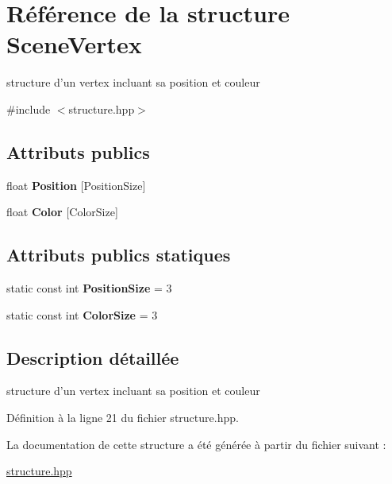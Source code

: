 \hypertarget{structSceneVertex}{\section{Référence de la structure Scene\+Vertex}
\label{structSceneVertex}
}


structure d'un vertex incluant sa position et couleur  




{\ttfamily \#include $<$structure.\+hpp$>$}

\subsection*{Attributs publics}
\begin{DoxyCompactItemize}
\item 
\hypertarget{structSceneVertex_a3b2fe4c69d1330e393abcae994fdfed9}{float {\bfseries Position} \mbox{[}Position\+Size\mbox{]}}\label{structSceneVertex_a3b2fe4c69d1330e393abcae994fdfed9}

\item 
\hypertarget{structSceneVertex_aaf06d2c21e570391181f8b8ff0b162d8}{float {\bfseries Color} \mbox{[}Color\+Size\mbox{]}}\label{structSceneVertex_aaf06d2c21e570391181f8b8ff0b162d8}

\end{DoxyCompactItemize}
\subsection*{Attributs publics statiques}
\begin{DoxyCompactItemize}
\item 
\hypertarget{structSceneVertex_a4c6d899962f4aa76b72a1b60bf27b289}{static const int {\bfseries Position\+Size} = 3}\label{structSceneVertex_a4c6d899962f4aa76b72a1b60bf27b289}

\item 
\hypertarget{structSceneVertex_aa83902f4f46f52e90a75f120f1d8e54b}{static const int {\bfseries Color\+Size} = 3}\label{structSceneVertex_aa83902f4f46f52e90a75f120f1d8e54b}

\end{DoxyCompactItemize}


\subsection{Description détaillée}
structure d'un vertex incluant sa position et couleur 

Définition à la ligne 21 du fichier structure.\+hpp.



La documentation de cette structure a été générée à partir du fichier suivant \+:\begin{DoxyCompactItemize}
\item 
\hyperlink{structure_8hpp}{structure.\+hpp}\end{DoxyCompactItemize}
